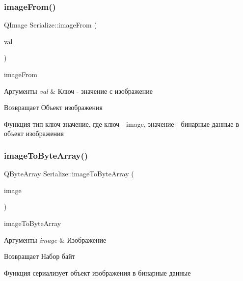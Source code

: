\subsubsection{\texorpdfstring{image\+From()}{imageFrom()}}
{\footnotesize\ttfamily Q\+Image Serialize\+::image\+From (\begin{DoxyParamCaption}\item[{const Q\+Json\+Value \&}]{val }\end{DoxyParamCaption})}



image\+From 


\begin{DoxyParams}{Аргументы}
{\em val} & Ключ -\/ значение с изображение \\
\hline
\end{DoxyParams}
\begin{DoxyReturn}{Возвращает}
Объект изображения
\end{DoxyReturn}
Функция тип ключ значение, где ключ -\/ image, значение -\/ бинарные данные в объект изображения \mbox{\label{namespaceSerialize_a11412877176c667f31a331bfac95d7e1}} 
\subsubsection{\texorpdfstring{image\+To\+Byte\+Array()}{imageToByteArray()}}
{\footnotesize\ttfamily Q\+Byte\+Array Serialize\+::image\+To\+Byte\+Array (\begin{DoxyParamCaption}\item[{const Q\+Image \&}]{image }\end{DoxyParamCaption})}



image\+To\+Byte\+Array 


\begin{DoxyParams}{Аргументы}
{\em image} & Изображение \\
\hline
\end{DoxyParams}
\begin{DoxyReturn}{Возвращает}
Набор байт
\end{DoxyReturn}
Функция сериализует объект изображения в бинарные данные \mbox{\label{namespaceSerialize_a794b837e3f9323b238c5b4d115f5c78b}} 

